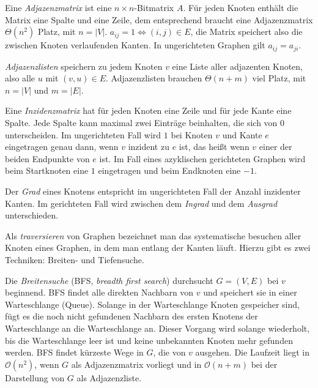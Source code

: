 Eine \textit{Adjazenzmatrix} ist eine $n \times n$-Bitmatrix $A$. Für jeden Knoten enthält die Matrix eine Spalte und eine Zeile, dem entsprechend braucht eine Adjazenzmatrix $\Theta(n^2)$ Platz, mit $n = |V|$. $a_{ij} = 1 \Leftrightarrow (i,j) \in E$, die Matrix speichert also die zwischen Knoten verlaufenden Kanten. In ungerichteten Graphen gilt $a_{ij} = a_{ji}$.

\textit{Adjazenzlisten} speichern zu jedem Knoten $v$ eine Liste aller adjazenten Knoten, also alle $u$ mit $(v, u) \in E$. Adjazenzlisten brauchen $\Theta(n + m)$ viel Platz, mit $n = |V|$ und $m = |E|$.

Eine \textit{Inzidenzmatrix} hat für jeden Knoten eine Zeile und für jede Kante eine Spalte. Jede Spalte kann maximal zwei Einträge beinhalten, die sich von $0$ unterscheiden. Im ungerichteten Fall wird $1$ bei Knoten $v$ und Kante $e$ eingetragen genau dann, wenn $v$ inzident zu $e$ ist, das heißt wenn $v$ einer der beiden Endpunkte von $e$ ist. Im Fall eines azyklischen gerichteten Graphen wird beim Startknoten eine $1$ eingetragen und beim Endknoten eine $-1$.

\begin{Def}
  \hspace{\parindent}Der \textit{Grad} eines Knotens entspricht im ungerichteten Fall der Anzahl inzidenter Kanten. Im gerichteten Fall wird zwischen dem \textit{Ingrad} und dem \textit{Ausgrad} unterschieden.
\end{Def}

\begin{Def}
  \hspace{\parindent}Als \textit{traversieren} von Graphen bezeichnet man das systematische besuchen aller Knoten eines Graphen, in dem man entlang der Kanten läuft. Hierzu gibt es zwei Techniken: Breiten- und Tiefensuche.
\end{Def}

Die \textit{Breitensuche} (BFS, \textit{breadth first search}) durchsucht $G=(V, E)$ bei $v$ beginnend. BFS findet alle direkten Nachbarn von $v$ und speichert sie in einer Warteschlange (Queue). Solange in der Warteschlange Knoten gespeicher sind, fügt es die noch nicht gefundenen Nachbarn des ersten Knotens der Warteschlange an die Warteschlange an. Dieser Vorgang wird solange wiederholt, bis die Warteschlange leer ist und keine unbekannten Knoten mehr gefunden werden. BFS findet kürzeste Wege in $G$, die von $v$ ausgehen. Die Laufzeit liegt in $\mathcal{O}(n^2)$, wenn $G$ als Adjazenzmatrix vorliegt und in $\mathcal{O}(n+m)$ bei der Darstellung von $G$ als Adjazenzliste.

